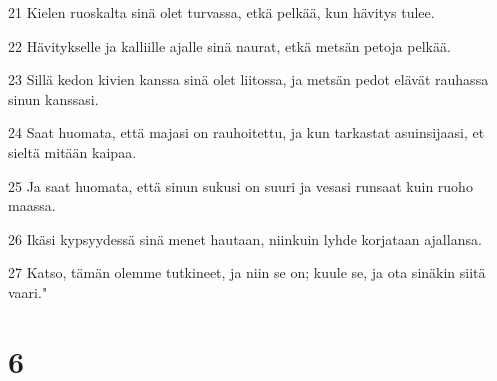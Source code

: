 \par 21 Kielen ruoskalta sinä olet turvassa, etkä pelkää, kun hävitys tulee.
\par 22 Hävitykselle ja kalliille ajalle sinä naurat, etkä metsän petoja pelkää.
\par 23 Sillä kedon kivien kanssa sinä olet liitossa, ja metsän pedot elävät rauhassa sinun kanssasi.
\par 24 Saat huomata, että majasi on rauhoitettu, ja kun tarkastat asuinsijaasi, et sieltä mitään kaipaa.
\par 25 Ja saat huomata, että sinun sukusi on suuri ja vesasi runsaat kuin ruoho maassa.
\par 26 Ikäsi kypsyydessä sinä menet hautaan, niinkuin lyhde korjataan ajallansa.
\par 27 Katso, tämän olemme tutkineet, ja niin se on; kuule se, ja ota sinäkin siitä vaari."

\chapter{6}

